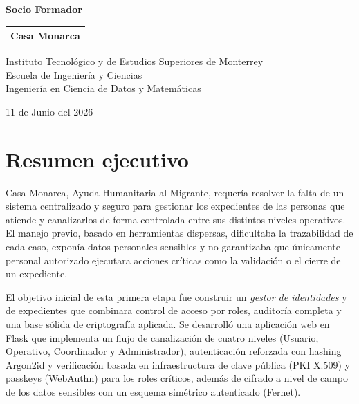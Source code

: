 \documentclass[10pt,letterpaper]{report}
\begin{document}
\begin{titlepage}
\begin{center}
\vspace{0.6cm}

{\large \textbf{Socio Formador}}

\vspace{0.3cm}

\begin{tabular}{c}
\toprule
Casa Monarca \\
\bottomrule
\end{tabular}

\vfill

{\large Instituto Tecnológico y de Estudios Superiores de Monterrey}\\
{\large Escuela de Ingeniería y Ciencias}\\
{\large Ingeniería en Ciencia de Datos y Matemáticas}

\vspace{0.6cm}

{\large 11 de Junio del 2026}

\end{center}
\end{titlepage}

\section{Resumen ejecutivo}

Casa Monarca, Ayuda Humanitaria al Migrante, requería resolver la falta de un
sistema centralizado y seguro para gestionar los expedientes de las personas que
atiende y canalizarlos de forma controlada entre sus distintos niveles
operativos. El manejo previo, basado en herramientas dispersas, dificultaba la
trazabilidad de cada caso, exponía datos personales sensibles y no garantizaba
que únicamente personal autorizado ejecutara acciones críticas como la
validación o el cierre de un expediente.

El objetivo inicial de esta primera etapa fue construir un \emph{gestor de
identidades} y de expedientes que combinara control de acceso por roles,
auditoría completa y una base sólida de criptografía aplicada. Se desarrolló una
aplicación web en Flask que implementa un flujo de canalización de cuatro
niveles (Usuario, Operativo, Coordinador y Administrador), autenticación
reforzada con hashing Argon2id y verificación basada en infraestructura de clave
pública (PKI X.509) y passkeys (WebAuthn) para los roles críticos, además de
cifrado a nivel de campo de los datos sensibles con un esquema simétrico
autenticado (Fernet).
\end{document}
